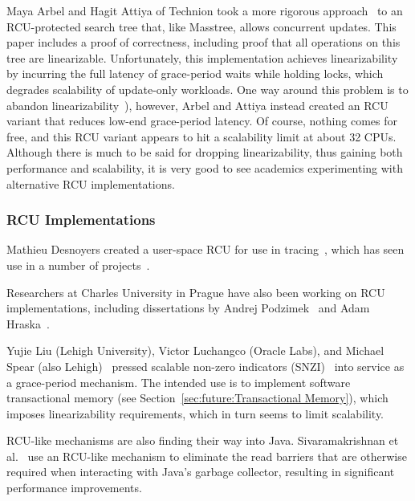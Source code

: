 Maya Arbel and Hagit Attiya of Technion took a more rigorous
approach~\cite{MayaArbel2014RCUtree} to an RCU-protected search tree that,
like Masstree, allows concurrent updates.
This paper includes a proof of correctness, including proof that all
operations on this tree are linearizable.
Unfortunately, this implementation achieves linearizability by incurring
the full latency of grace-period waits while holding locks, which degrades
scalability of update-only workloads.
One way around this problem is to abandon
linearizability~\cite{AndreasHaas2012FIFOisnt,PaulEMcKennneyAtomicTreeN4037}),
however, Arbel and Attiya instead created an RCU variant that reduces
low-end grace-period latency.
Of course, nothing comes for free, and this RCU variant appears to hit
a scalability limit at about 32 CPUs.
Although there is much to be said for dropping linearizability, thus
gaining both performance and scalability, it is very good to see academics
experimenting with alternative RCU implementations.

\subsubsection{RCU Implementations}
\label{sec:defer:RCU Implementations}

Mathieu Desnoyers created a user-space RCU for use in
tracing~\cite{MathieuDesnoyers2009URCU,MathieuDesnoyersPhD,MathieuDesnoyers2012URCU},
which has seen use in a number of projects~\cite{MikeDay2013RCUqemu}.

Researchers at Charles University in Prague have also been
working on RCU implementations, including dissertations by
Andrej Podzimek~\cite{AndrejPodzimek2010masters} and Adam
Hraska~\cite{AdamHraska2013RCUHelenOS}.

Yujie Liu (Lehigh University), Victor Luchangco (Oracle Labs), and
Michael Spear (also Lehigh)~\cite{Liu:2013:MSA:2549695.2549732}
pressed scalable non-zero indicators
(SNZI)~\cite{FaithEllen:2007:SNZI} into service as a grace-period
mechanism.
The intended use is to implement software transactional memory
(see Section~\ref{sec:future:Transactional Memory}), which
imposes linearizability requirements, which in turn seems to
limit scalability.

RCU-like mechanisms are also finding their way into Java.
Sivaramakrishnan et al.~\cite{Sivaramakrishnan:2012:ERB:2258996.2259005}
use an RCU-like mechanism to eliminate the read barriers that are
otherwise required when interacting with Java's garbage collector,
resulting in significant performance improvements.

